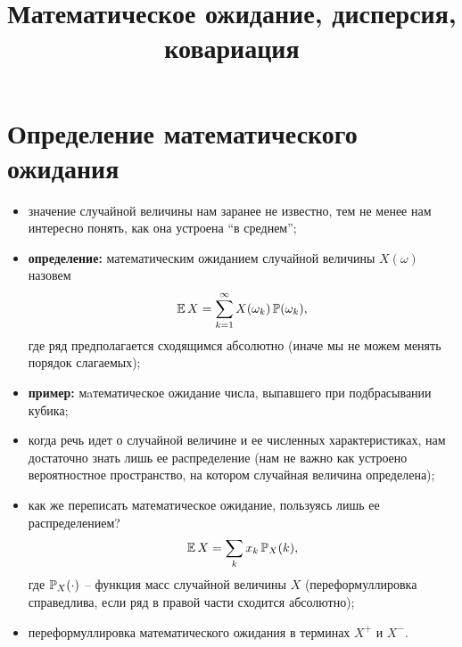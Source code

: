 

\title{Математическое ожидание, дисперсия, ковариация}
\date{\vspace{-1cm}}


\maketitle

\section*{Определение математического ожидания}
\begin{itemize}
    \item
    значение случайной величины нам заранее не известно, тем не менее нам интересно понять, как она устроена ``в среднем'';
    \item
    \textbf{определение:} математическим ожиданием случайной величины $X(\omega)$ назовем
    \[
        \operatorname{\mathbb{E}} X = \sum_{k = 1}^{\infty} X(\omega_k) \operatorname{\mathbb{P}}(\omega_k),
    \]
    где ряд предполагается сходящимся абсолютно (иначе мы не можем менять порядок слагаемых);
    \item
    \textbf{пример:} мaтематическое ожидание числа, выпавшего при подбрасывании кубика;
    \item
    когда речь идет о случайной величине и ее численных характеристиках, нам достаточно знать лишь ее распределение (нам не важно как устроено вероятностное пространство, на котором случайная величина определена);
    \item
    как же переписать математическое ожидание, пользуясь лишь ее распределением?
    \[
        \operatorname{\mathbb{E}} X = \sum_{k} x_k \operatorname{\mathbb{P}}_X(k),
    \] 
    где $\operatorname{\mathbb{P}}_X(\cdot)$ -- функция масс случайной величины $X$ (переформуллировка справедлива, если ряд в правой части сходится абсолютно);
    \item
    переформуллировка математического ожидания в терминах $X^{+}$ и $X^{-}$.
\end{itemize}

